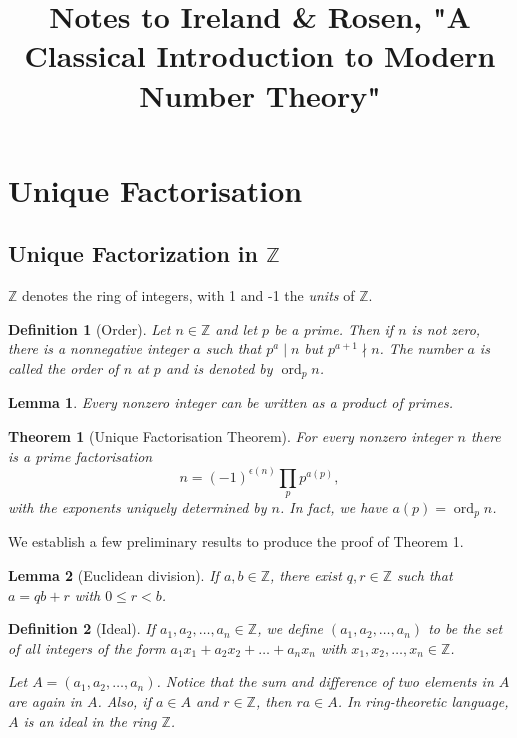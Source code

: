 \documentclass{article}
\newtheorem*{definition*}{Definition}
\newtheorem{lemma}{Lemma}
\numberwithin{proposition}{subsection}
\newtheorem{theorem}{Theorem}
\DeclareMathOperator{\ord}{ord}
\begin{document}
\title{Notes to Ireland \& Rosen, "A Classical Introduction to Modern Number
Theory"}
\maketitle

\section{Unique Factorisation}

\subsection{Unique Factorization in $\mathbb{Z}$}

$\mathbb{Z}$ denotes the ring of integers, with 1 and -1 the \emph{units} of
$\mathbb{Z}$.

\begin{definition*}[Order]
  Let $n \in \mathbb{Z}$ and let $p$ be a prime. Then if $n$ is not zero, there
  is a nonnegative integer $a$ such that $p^a \mid n$ but $p^{a + 1} \nmid n$.
  The number $a$ is called the \emph{order} of $n$ at $p$ and is denoted by
  $\ord_p n$.
\end{definition*}

\begin{lemma}
  Every nonzero integer can be written as a product of primes.
\end{lemma}

\begin{theorem}[Unique Factorisation Theorem]
  For every nonzero integer $n$ there is a prime factorisation \[ n =
  (-1)^{\epsilon(n)} \prod_p p^{a(p)}, \] with the exponents uniquely
  determined by $n$. In fact, we have $a(p) = \ord_p n$.
\end{theorem}

We establish a few preliminary results to produce the proof of Theorem 1.

\begin{lemma}[Euclidean division]
  If $a, b \in \mathbb{Z}$, there exist $q, r \in \mathbb{Z}$ such that $a = qb
  + r$ with $0 \leq r < b$.
\end{lemma}

\begin{definition*}[Ideal]
  If $a_1, a_2, \ldots, a_n \in \mathbb{Z}$, we define $(a_1, a_2, \ldots,
  a_n)$ to be the set of all integers of the form $a_1x_1 + a_2x_2 + \ldots +
  a_nx_n$ with $x_1, x_2, \ldots, x_n \in \mathbb{Z}$.

  Let $A = (a_1, a_2, \ldots, a_n)$. Notice that the sum and difference of two
  elements in $A$ are again in $A$. Also, if $a \in A$ and $r \in \mathbb{Z}$,
  then $ra \in A$. In ring-theoretic language, $A$ is an \emph{ideal} in the
  ring $\mathbb{Z}$.
\end{definition*}
\end{document}
